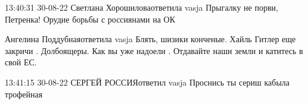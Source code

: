  
 
 
 
 

13:40:31 30-08-22
Светлана Хорошиловаответила vasja
Прыгалку не порви, Петренка! Орудие борьбы с россиянами на ОК

Ангелина Поддубнаяответила vasja
Блять, шизики конченые. Хайль Гитлер еще закричи . Долбоящеры. Как вы уже надоели . Отдавайте наши земли и катитесь в свой ЕС.

13:41:15 30-08-22
СЕРГЕЙ РОССИЯответил vasja
Проснись ты сериш кабыла трофейная
